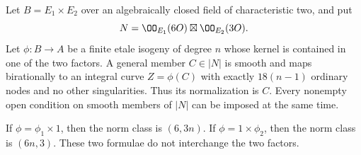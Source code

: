 \begin{lemma}
\label{lem:DE-A3-axis-nodal-norm}
Let $B=E_1\times E_2$ over an algebraically closed field of
characteristic two, and put
\[
             N=\OO_{E_1}(6O)\boxtimes\OO_{E_2}(3O).
\]
Let $\phi:B\to A$ be a finite etale isogeny of degree $n$ whose
kernel is contained in one of the two factors.
A general member $C\in|N|$ is smooth and maps birationally to
an integral curve $Z=\phi(C)$ with exactly $18(n-1)$ ordinary
nodes and no other singularities.  Thus its normalization is $C$.
Every nonempty open condition on smooth members of $|N|$ can
be imposed at the same time.

If $\phi=\phi_1\times1$, then the norm class is $(6,3n)$.
If $\phi=1\times\phi_2$, then the norm class is $(6n,3)$.
These two formulae do not interchange the two factors.
\end{lemma}

